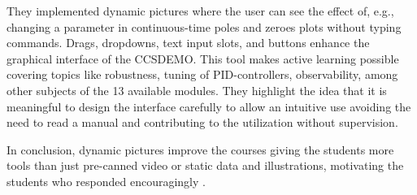 They implemented dynamic pictures where the user can see the effect of, e.g., changing a parameter in continuous-time poles and zeroes plots without typing commands. Drags, dropdowns, text input slots, and buttons enhance the graphical interface of the CCSDEMO. This tool makes active learning possible covering topics like robustness, tuning of PID-controllers, observability, among other subjects of the 13 available modules. They highlight the idea that it is meaningful to design the interface carefully to allow an intuitive use avoiding the need to read a manual and contributing to the utilization without supervision.

In conclusion, dynamic pictures improve the courses giving the students more tools than just pre-canned video or static data and illustrations, motivating the students who responded encouragingly \cite{IEEEcontrol}.

